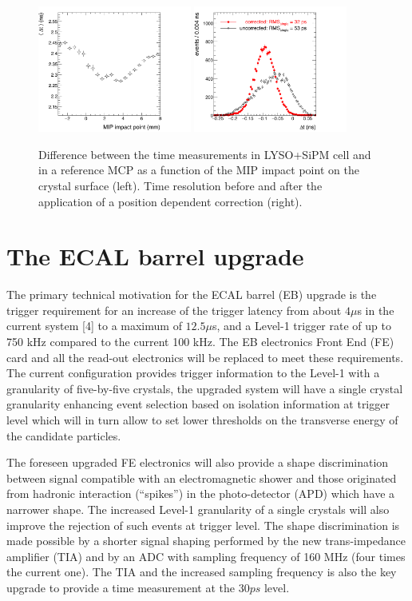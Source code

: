 \begin{figure}[h!]
  \centering
  \includegraphics[width = 0.45\textwidth]{figures/upgrade/c_posProfile.png}
  \includegraphics[width = 0.45\textwidth]{figures/upgrade/c_CTR_posCorr.png}
  \caption{Difference between the time measurements in LYSO+SiPM cell and in a reference MCP
    as a function of the MIP impact point on the crystal surface (left).
    Time resolution before and after the application of a position dependent correction (right).}
  \label{fig:btl_time_res}
\end{figure}

\section{The ECAL barrel upgrade}
The primary technical motivation for the ECAL barrel (EB) upgrade is the trigger requirement for
an increase of the trigger latency from about $4\mu$s in the current system [4] to a maximum of $12.5\mu$s,
and a Level-1 trigger rate of up to 750 kHz compared to the current 100 kHz.
The EB electronics Front End (FE) card and all the read-out electronics will be replaced to
meet these requirements. The current configuration provides trigger information to the Level-1
with a granularity of five-by-five crystals, the upgraded system will have a single crystal granularity
enhancing event selection based on isolation information at trigger level which will in turn allow
to set lower thresholds on the transverse energy of the candidate particles.

The foreseen upgraded FE electronics will also provide a shape discrimination between
signal compatible with an electromagnetic shower and those originated from hadronic interaction (``spikes'') in
the photo-detector (APD) which have a narrower shape. The increased Level-1 granularity of a single crystals
will also improve the rejection of such events at trigger level.
The shape discrimination is made possible by a shorter signal shaping performed by the new trans-impedance amplifier
(TIA) and by an ADC with sampling frequency of 160 MHz (four times the current one). The TIA and the increased sampling
frequency is also the key upgrade to provide a time measurement at the $30 ps$ level.

